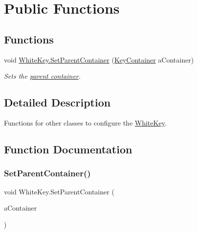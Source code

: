 \hypertarget{group___white_key_pub_func}{}\section{Public Functions}
\label{group___white_key_pub_func}
\subsection*{Functions}
\begin{DoxyCompactItemize}
\item 
void \hyperlink{group___white_key_pub_func_gab926585e88db73a20431ac93d979b61d}{White\+Key.\+Set\+Parent\+Container} (\hyperlink{class_key_container}{Key\+Container} a\+Container)
\begin{DoxyCompactList}\small\item\em Sets the \hyperlink{group___doc_key_contain}{parent container}. \end{DoxyCompactList}\end{DoxyCompactItemize}


\subsection{Detailed Description}
Functions for other classes to configure the \hyperlink{class_white_key}{White\+Key}. 

\subsection{Function Documentation}
\mbox{\label{group___white_key_pub_func_gab926585e88db73a20431ac93d979b61d}} 
\subsubsection{\texorpdfstring{Set\+Parent\+Container()}{SetParentContainer()}}
{\footnotesize\ttfamily void White\+Key.\+Set\+Parent\+Container (\begin{DoxyParamCaption}\item[{\hyperlink{class_key_container}{Key\+Container}}]{a\+Container }\end{DoxyParamCaption})}



